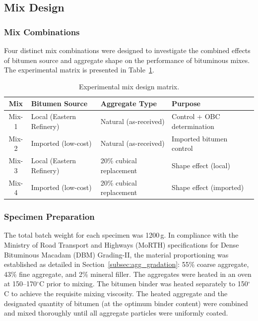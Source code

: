 \documentclass[12pt,a4paper]{article}
\begin{document}
\subsection{Mix Design}

\subsubsection{Mix Combinations}

Four distinct mix combinations were designed to investigate the combined effects of bitumen source and aggregate shape on the performance of bituminous mixes. The experimental matrix is presented in Table~\ref{tab:mix_matrix}.

\begin{table}[htbp]
    \centering
    \caption{Experimental mix design matrix.}
    \label{tab:mix_matrix}
    \begin{tabular}{@{}clll@{}}
        \toprule
        \textbf{Mix} & \textbf{Bitumen Source} & \textbf{Aggregate Type} & \textbf{Purpose} \\
        \midrule
        Mix-1 & Local (Eastern Refinery) & Natural (as-received) & Control + OBC determination \\
        Mix-2 & Imported (low-cost) & Natural (as-received) & Imported bitumen control \\
        Mix-3 & Local (Eastern Refinery) & 20\% cubical replacement & Shape effect (local) \\
        Mix-4 & Imported (low-cost) & 20\% cubical replacement & Shape effect (imported) \\
        \bottomrule
    \end{tabular}
\end{table}

\subsubsection{Specimen Preparation}

The total batch weight for each specimen was 1200\,g. In compliance with the Ministry of Road Transport and Highways (MoRTH) specifications for Dense Bituminous Macadam (DBM) Grading-II, the material proportioning was established as detailed in Section~\ref{subsec:agg_gradation}: 55\% coarse aggregate, 43\% fine aggregate, and 2\% mineral filler. The aggregates were heated in an oven at 150--170$^{\circ}$C prior to mixing. The bitumen binder was heated separately to 150$^{\circ}$C to achieve the requisite mixing viscosity. The heated aggregate and the designated quantity of bitumen (at the optimum binder content) were combined and mixed thoroughly until all aggregate particles were uniformly coated.
\end{document}
